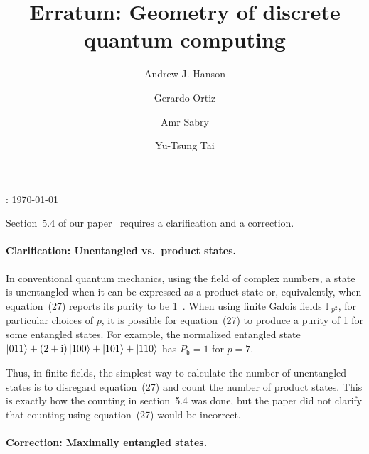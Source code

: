 \documentclass{iopart}
\newcommand{\ff}[1]{\mathbb{F}_{#1}}
\def\fh{\mathfrak{h}}
\begin{document}
\title{Erratum: Geometry of discrete quantum computing}


\author{Andrew J. Hanson}


\address{School of Informatics and Computing, Indiana University, Bloomington,
IN 47405, U.S.A}


\author{Gerardo Ortiz}


\address{Department of Physics, Indiana University, Bloomington, IN 47405,
U.S.A}


\author{Amr Sabry}


\address{School of Informatics and Computing, Indiana University, Bloomington,
IN 47405, U.S.A}


\author{Yu-Tsung Tai}


\address{Department of Mathematics, Indiana University, Bloomington, IN 47405,
U.S.A}


\address{School of Informatics and Computing, Indiana University, Bloomington,
IN 47405, U.S.A}


: {\today}

\maketitle

\noindent Section~5.4 of our paper~\cite{geometry} requires a clarification and a correction.

\paragraph*{Clarification: Unentangled vs.\ product states.}

In conventional quantum mechanics, using the field of complex numbers, a state is unentangled when it can be expressed as a product state or, equivalently, when equation~(27) reports its purity to be 1~\cite{}. When using finite Galois fields $\ff{p^2}$, for particular choices of $p$, it is possible for equation~(27) to produce a purity of 1 for some entangled states. For example, the normalized entangled state $\ket{011}+\left(2+\mathrm{i}\right)\ket{100}+\ket{101}+\ket{110}$ has $P_{\fh}=1$ for $p=7$.

Thus, in finite fields, the simplest way to calculate the number of
unentangled states is to disregard equation~(27) and count the number
of product states. This is exactly how the counting in section~5.4
was done, but the paper did not clarify that counting using equation~(27) would be incorrect.

\paragraph*{Correction: Maximally entangled states.}
\end{document}
